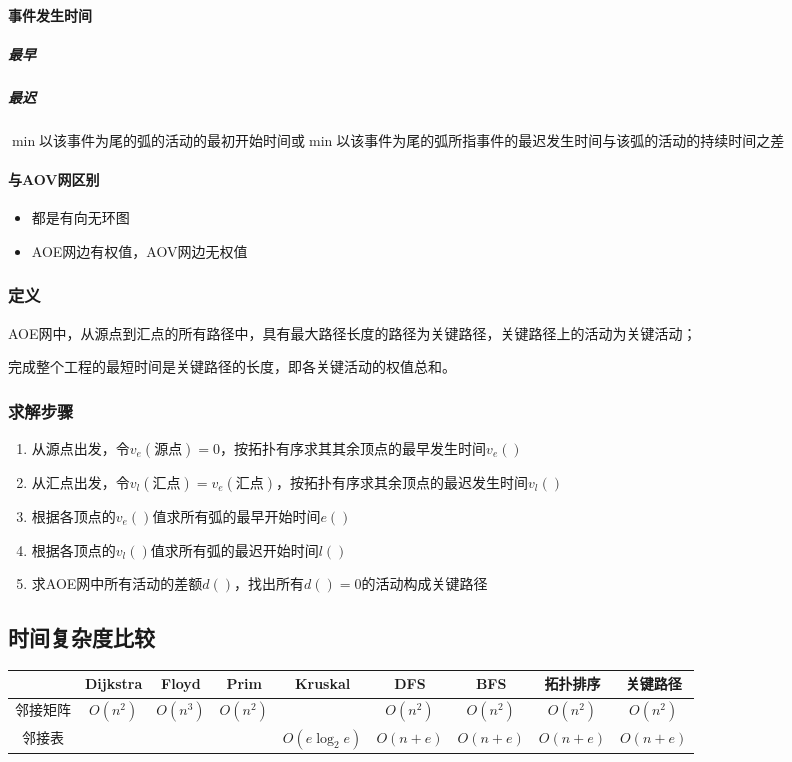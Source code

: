 \paragraph{事件发生时间}

\subparagraph{最早}

\subparagraph{最迟}
\(\min\){以该事件为尾的弧的活动的最初开始时间}或\(\min\){以该事件为尾的弧所指事件的最迟发生时间与该弧的活动的持续时间之差}


\paragraph{与AOV网区别}
\begin{itemize}
    \item 都是有向无环图
    \item AOE网边有权值，AOV网边无权值
\end{itemize}


\subsubsection{定义}
AOE网中，从源点到汇点的所有路径中，具有最大路径长度的路径为关键路径，关键路径上的活动为关键活动；

完成整个工程的最短时间是关键路径的长度，即各关键活动的权值总和。

\subsubsection{求解步骤}
\begin{enumerate}
    \item 从源点出发，令\(v_e(\text{源点}) = 0\)，按拓扑有序求其其余顶点的最早发生时间\(v_e()\)
    \item 从汇点出发，令\(v_l(\text{汇点}) = v_e(\text{汇点})\)，按拓扑有序求其余顶点的最迟发生时间\(v_l()\)
    \item 根据各顶点的\(v_e()\)值求所有弧的最早开始时间\(e()\)
    \item 根据各顶点的\(v_l()\)值求所有弧的最迟开始时间\(l()\)
    \item 求AOE网中所有活动的差额\(d()\)，找出所有\(d() = 0\)的活动构成关键路径
\end{enumerate}


\subsection{时间复杂度比较}
\begin{center}
    \begin{tabular}{c|c|c|c|c|c|c|c|c}
         & Dijkstra & Floyd & Prim & Kruskal & DFS & BFS & 拓扑排序 & 关键路径 \\ 
        \hline
        邻接矩阵 & \(O(n^2)\) & \(O(n^3)\) & \(O(n^2)\) & & \(O(n ^2)\) & \(O(n^2)\) & \(O(n^2)\) & \(O(n^2)\) \\ 
        \hline
        邻接表 & & & & \(O(e\log_2e)\) & \(O(n + e)\) & \(O(n + e)\) & \(O(n + e)\) & \(O(n + e)\)
    \end{tabular}
\end{center}


